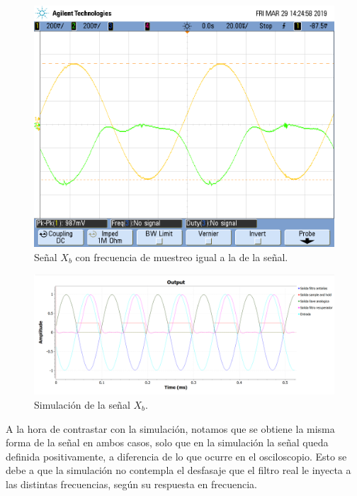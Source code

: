\documentclass[../../ASSD_TP1_G7.tex]{subfiles}
\begin{document}
\begin{figure}[H]
\begin{centering}
\includegraphics[scale=0.3]{Imagenes/llave_senooo_pto_c}\caption{Señal $X_{b}$ con frecuencia de muestreo igual a la de la señal.}
\par\end{centering}
\end{figure}

\begin{figure}[H]

\begin{centering}
\includegraphics[scale=0.5]{Imagenes/simulacion_llave_seno_c.PNG}\caption{Simulación de la señal $X_{b}$.}
\par\end{centering}
\end{figure}

A la hora de contrastar con la simulación, notamos que se obtiene
la misma forma de la señal en ambos casos, solo que en la simulación
la señal queda definida positivamente, a diferencia de lo que ocurre
en el osciloscopio. Esto se debe a que la simulación no contempla
el desfasaje que el filtro real le inyecta a las distintas frecuencias, según su respuesta en frecuencia.
\end{document}
